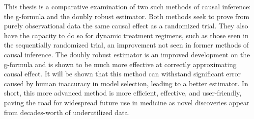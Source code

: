 This thesis is a comparative examination of two such methods of causal inference: the g-formula and the doubly robust estimator.  Both methods seek to prove from purely observational data the same causal effect as a randomized trial. They also have the capacity to do so for dynamic treatment regimens, such as those seen in the sequentially randomized trial, an improvement not seen in former methods of causal inference.  The doubly robust estimator is an improved development on the g-formula and is shown to be much more effective at correctly approximating causal effect.  It will be shown that this method can withstand significant error caused by human inaccuracy in model selection, leading to a better estimator.  In short, this more advanced method is more efficient, effective, and user-friendly, paving the road for widespread future use in medicine as novel discoveries appear from decades-worth of underutilized data.  




 
 
 
 



